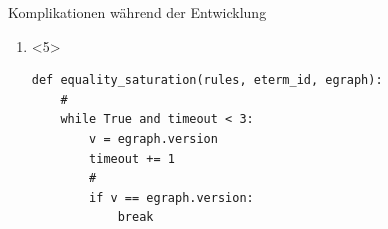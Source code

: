 \begin{frame}[fragile]{Komplikationen während der Entwicklung}
\begin{enumerate}
        \begin{onlyenv}<3>
            \vspace{3mm}
            \begin{center}
\begin{verbatim}    
def egraph_to_dot(self, nodesep=0.5, ranksep=0.5, marked_eclasses = []):
    dot_commands = [
        "digraph parent { graph [compound=true, nodesep=" + str(nodesep)
        + ", ranksep=" + str(ranksep) + "]\n" + """node [fillcolor=white 
        fontname=\"Times-Bold\" fontsize=20 shape=record style=\"rounded, 
        filled\"]\n"""
    ]
    # ... insgesamt 106 Zeilen lang
    return "".join(dot_commands)
\end{verbatim}
        \end{center}
        \end{onlyenv}

        \item {}
        
        
\begin{onlyenv}<5>
    \vspace{3mm}
    \begin{center}
\begin{verbatim}    
def equality_saturation(rules, eterm_id, egraph):
    #
    while True and timeout < 3:
        v = egraph.version
        timeout += 1
        #
        if v == egraph.version:
            break
\end{verbatim}
\end{center}
\end{onlyenv}


\end{enumerate}
\end{frame}

